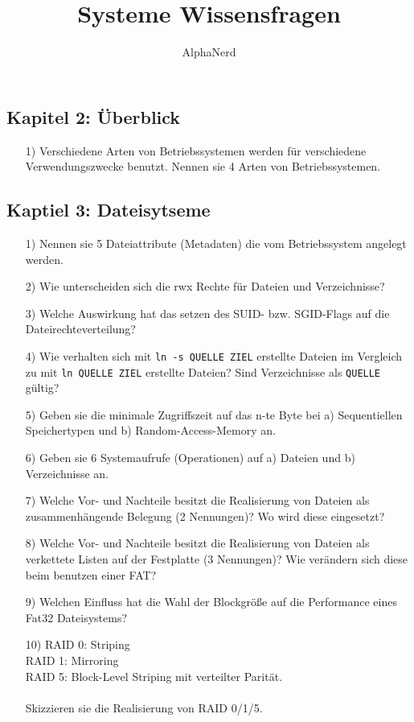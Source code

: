 \documentclass[11pt,a4paper]{article}
\author{AlphaNerd}
\title{Systeme Wissensfragen}
\begin{document}
\maketitle


\subsection*{Kapitel 2: Überblick}
\begin{itemize}
\item[1)]
Verschiedene Arten von Betriebssystemen werden für verschiedene Verwendungszwecke benutzt. Nennen sie 4 Arten von Betriebssystemen.
\end{itemize}


\subsection*{Kaptiel 3: Dateisytseme}
\begin{itemize}
\item[1)] Nennen sie 5 Dateiattribute (Metadaten) die vom Betriebssystem angelegt werden.
\item[2)] Wie unterscheiden sich die rwx Rechte für Dateien und Verzeichnisse?
\item[3)] Welche Auswirkung hat das setzen des SUID- bzw. SGID-Flags auf die Dateirechteverteilung?
\item[4)] Wie verhalten sich mit \texttt{ln -s QUELLE ZIEL} erstellte Dateien im Vergleich zu mit \texttt{ln QUELLE ZIEL} erstellte Dateien? Sind Verzeichnisse als \texttt{QUELLE} gültig?
\item[5)] Geben sie die minimale Zugriffszeit auf das n-te Byte bei a) Sequentiellen Speichertypen und b) Random-Access-Memory an.
\item[6)] Geben sie 6 Systemaufrufe (Operationen) auf a) Dateien und b) Verzeichnisse an.
\item[7)] Welche Vor- und Nachteile besitzt die Realisierung von Dateien als zusammenhängende Belegung (2 Nennungen)? Wo wird diese eingesetzt?
\item[8)] Welche Vor- und Nachteile besitzt die Realisierung von Dateien als verkettete Listen auf der Festplatte (3 Nennungen)? Wie verändern sich diese beim benutzen einer FAT?
\item[9)] Welchen Einfluss hat die Wahl der Blockgröße auf die Performance eines Fat32 Dateisystems?
\item[10)] RAID 0: Striping \\RAID 1: Mirroring \\ RAID 5: Block-Level Striping mit verteilter Parität.\\
\\
Skizzieren sie die Realisierung von RAID 0/1/5.
\end{itemize}
\end{document}
